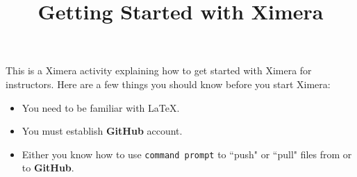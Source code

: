 \documentclass{ximera}
\title{Getting Started with Ximera}
\begin{document}
\maketitle

This is a Ximera activity explaining how to get started with Ximera for instructors. 
  Here are a few things you should know before you start Ximera:
  
  \begin{itemize}
  \item You need to be familiar with \LaTeX.
  \item You must establish \textbf{GitHub} account.
  \item Either you know how to use \texttt{command prompt} to ``push" or ``pull" files from or to \textbf{GitHub}.
  \end{itemize}
\end{document}
